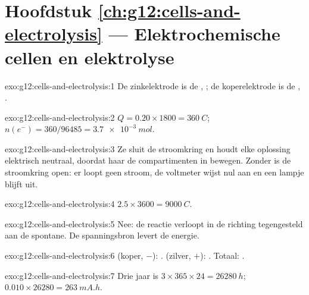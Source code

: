 \section*{Hoofdstuk \ref{ch:g12:cells-and-electrolysis} --- Elektrochemische cellen en elektrolyse}

\begin{solution}{exo:g12:cells-and-electrolysis:1}
De zinkelektrode is de , ; de koperelektrode
is de , .
\end{solution}

\begin{solution}{exo:g12:cells-and-electrolysis:2}
$Q = 0.20 \times 1800 = \qty{360}{C}$; $n(e^-) = 360/96485 =
\qty{3.7e-3}{mol}$.
\end{solution}

\begin{solution}{exo:g12:cells-and-electrolysis:3}
Ze sluit de stroomkring en houdt elke oplossing elektrisch neutraal,
doordat haar  de compartimenten in bewegen. Zonder  is de
stroomkring open: er loopt geen stroom, de voltmeter wijst nul aan en een
lampje blijft uit.
\end{solution}

\begin{solution}{exo:g12:cells-and-electrolysis:4}
$2.5 \times 3600 = \qty{9000}{C}$.
\end{solution}

\begin{solution}{exo:g12:cells-and-electrolysis:5}
Nee: de reactie verloopt in de richting tegengesteld aan de spontane. De
spanningsbron levert de energie.
\end{solution}

\begin{solution}{exo:g12:cells-and-electrolysis:6}
 (koper, $-$): .  (zilver, $+$):
. Totaal: .
\end{solution}

\begin{solution}{exo:g12:cells-and-electrolysis:7}
Drie jaar is $3 \times 365 \times 24 = \qty{26280}{h}$;
$0.010 \times 26280 = \qty{263}{mA.h}$.
\end{solution}

